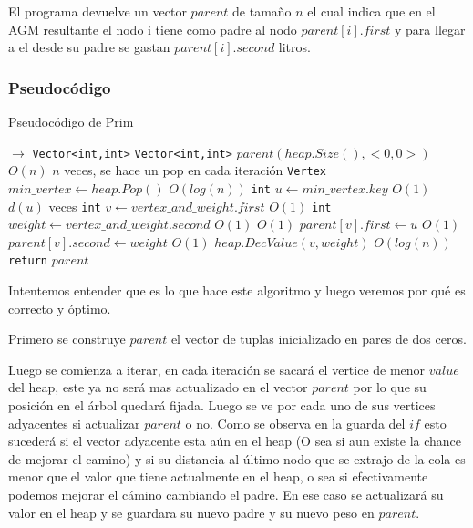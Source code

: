 El programa devuelve un vector $parent$ de tamaño $n$ el cual indica que en el AGM resultante el nodo i tiene como padre al nodo $parent[i].first$ y para llegar a el desde su padre se gastan $parent[i].second$ litros.

\subsubsection{Pseudocódigo}

\begin{algorithm}[H]
  \begin{algorithmic}[1]
  \caption{Pseudocódigo de Prim}
  \label{algo:2-2}
     $\rightarrow$ \texttt{Vector<int,int>}
    	\State \texttt{Vector<int,int>} $parent(heap.Size(), <0,0>)$
    	\Comment $O(n)$
    		\Comment $n$ veces, se hace un pop en cada iteración
    		\State \texttt{Vertex} $min\_vertex \gets heap.Pop()$
    		\Comment $O(log(n))$
    		\State \texttt{int} $ u \gets min\_vertex.key$
    		\Comment $O(1)$
    		\Comment $d(u)$ veces
	    		\State \texttt{int} $ v \gets vertex\_and\_weight.first$
	    		\Comment $O(1)$    			
	    		\State \texttt{int} $ weight \gets vertex\_and\_weight.second$
	    		\Comment $O(1)$    			
    			\Comment $O(1)$
    				\State $parent[v].first \gets u$
    				\Comment $O(1)$
    				\State $parent[v].second \gets weight$
    				\Comment $O(1)$
    				\State $heap.DecValue(v, weight)$
    				\Comment $O(log(n))$
    			\EndIf
    		\EndFor
    	\EndWhile
    	\State \texttt{return} $parent$
		\EndProcedure
	\end{algorithmic}
\end{algorithm}

Intentemos entender que es lo que hace este algoritmo y luego veremos por qué es correcto y óptimo.

Primero se construye $parent$ el vector de tuplas inicializado en pares de dos ceros. 

Luego se comienza a iterar, en cada iteración se sacará el vertice de menor $value$ del heap, este ya no será mas actualizado en el vector $parent$ por lo que su posición en el árbol quedará fijada. Luego se ve por cada uno de sus vertices adyacentes si actualizar $parent$ o no. Como se observa en la guarda del $if$ esto sucederá si el vector adyacente esta aún en el heap (O sea si aun existe la chance de mejorar el camino) y si su distancia al último nodo que se extrajo de la cola es menor que el valor que tiene actualmente en el heap, o sea si efectivamente podemos mejorar el cámino cambiando el padre. En ese caso se actualizará su valor en el heap y se guardara su nuevo padre y su nuevo peso en $parent$.

